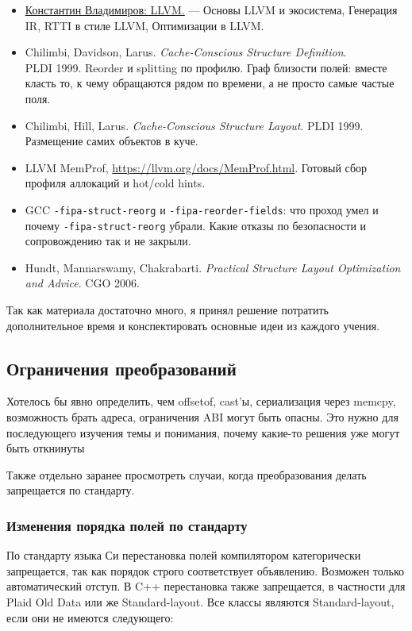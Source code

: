\documentclass[a4paper,12pt]{article}
\begin{document}
\begin{itemize}
    \item
        \href{https://sourceforge.net/projects/cpp-lects-rus/files/cpp-graduate/16-llvm.pdf/download}{Константин
        Владимиров: LLVM.} --- Основы LLVM и экосистема, Генерация IR, RTTI в стиле 
        LLVM, Оптимизации в LLVM.

    \item Chilimbi, Davidson, Larus. \textit{Cache-Conscious
    Structure Definition}. \\
    PLDI 1999. Reorder и splitting по профилю. Граф
    близости полей: вместе класть то, к чему обращаются рядом по
    времени, а не просто самые частые поля.
    \item Chilimbi, Hill, Larus. \textit{Cache-Conscious Structure
    Layout}. PLDI 1999. Размещение самих объектов в куче.
    \item LLVM MemProf, \url{https://llvm.org/docs/MemProf.html}.
    Готовый сбор профиля аллокаций и hot/cold hints. 
    \item GCC \texttt{-fipa-struct-reorg} и
    \texttt{-fipa-reorder-fields}: что проход умел и почему
    \texttt{-fipa-struct-reorg} убрали. Какие отказы по безопасности
    и сопровождению так и не закрыли. 
    \item Hundt, Mannarswamy, Chakrabarti. \textit{Practical Structure
    Layout Optimization and Advice}. CGO 2006. 
\end{itemize}

Так как материала достаточно много, я принял решение потратить дополнительное
время и конспектировать основные идеи из каждого учения.

\subsection{Ограничения преобразований}

 Хотелось бы явно определить, чем offsetof, cast'ы, сериализация через memcpy, возможность
 брать адреса, ограничения ABI могут быть опасны. Это нужно для последующего
 изучения темы и понимания, почему какие-то решения уже могут быть откнинуты

Также отдельно заранее просмотреть случаи, когда преобразования делать
запрещается по стандарту.

\subsubsection{Изменения порядка полей по стандарту}
По стандарту языка Си перестановка полей компилятором категорически запрещается,
так как порядок строго соответствует объявлению. Возможен только автоматический
отступ. В C++ перестановка также запрещается, в частности для Plaid Old Data или
же Standard-layout. Все классы являются Standard-layout, если они не имеются следующего:
\end{document}
